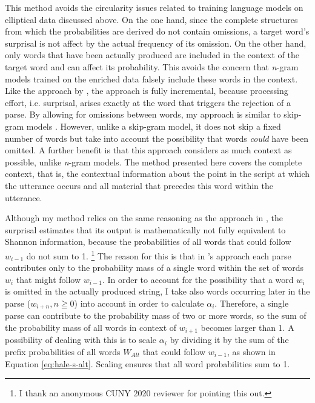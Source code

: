 This method avoids the circularity issues related to training language models on elliptical data discussed above. On the one hand, since the complete structures from which the probabilities are derived do not contain omissions, a target word's surprisal is not affect by the actual frequency of its omission. On the other hand, only words that have been actually produced are included in the context of the target word and can affect its probability. This avoids the concern that \textit{n}-gram models trained on the enriched data falsely include these words in the context. Like the approach by \citet{hale2001}, the approach is fully incremental, because processing effort, i.e. surprisal, arises exactly at the word that triggers the rejection of a parse. By allowing for omissions between words, my approach is similar to skip-gram models \citep{jans.etal2012}. However, unlike a skip-gram model, it does not skip a fixed number of words but take into account the possibility that words \textit{could} have been omitted. A further benefit is that this approach considers as much context as possible, unlike \textit{n}-gram models. The method presented here covers the complete context, that is, the contextual information about the point in the script at which the utterance occurs and all material that precedes this word within the utterance.

Although my method relies on the same reasoning as the approach in \citet{hale2001}, the surprisal estimates that its output is mathematically not fully equivalent to Shannon information, because the probabilities of all words that could follow $w_{i-1}$ do not sum to 1.%
%
\footnote{I thank an anonymous CUNY 2020 reviewer for pointing this out.}\afterfn%
%
The reason for this is that in \citeauthor{hale2001}'s approach each parse contributes only to the probability mass of a single word within the set of words $w_i$ that might follow $w_{i-1}$. In order to account for the possibility that a word $w_{i}$ is omitted in the actually produced string, I take also words occurring later in the parse ($w_{i+n}, n \geqq 0$) into account in order to calculate $\alpha_i$. Therefore, a single parse can contribute to the probability mass of two or more words, so the sum of the probability mass of all words in context of $w_{i+1}$ becomes larger than 1. A possibility of dealing with this is to scale $\alpha_i$ by dividing it by the sum of the prefix probabilities of all words $W_{Alt}$ that could follow $w_{i-1}$, as shown in Equation \ref{eq:hale-s-alt}. Scaling ensures that all word probabilities sum to 1.\largerpage

